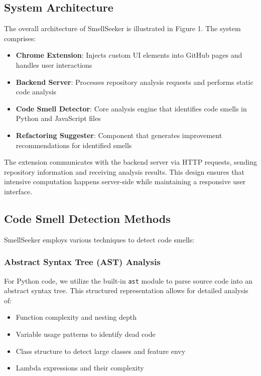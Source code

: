 \documentclass[sigconf,screen]{acmart}
\begin{document}
\subsection{System Architecture}

The overall architecture of SmellSeeker is illustrated in Figure 1. The system comprises:

\begin{itemize}
    \item \textbf{Chrome Extension}: Injects custom UI elements into GitHub pages and handles user interactions
    \item \textbf{Backend Server}: Processes repository analysis requests and performs static code analysis
    \item \textbf{Code Smell Detector}: Core analysis engine that identifies code smells in Python and JavaScript files
    \item \textbf{Refactoring Suggester}: Component that generates improvement recommendations for identified smells
\end{itemize}

The extension communicates with the backend server via HTTP requests, sending repository information and receiving analysis results. This design ensures that intensive computation happens server-side while maintaining a responsive user interface.

\subsection{Code Smell Detection Methods}

SmellSeeker employs various techniques to detect code smells:

\subsubsection{Abstract Syntax Tree (AST) Analysis}

For Python code, we utilize the built-in \texttt{ast} module to parse source code into an abstract syntax tree. This structured representation allows for detailed analysis of:

\begin{itemize}
    \item Function complexity and nesting depth
    \item Variable usage patterns to identify dead code
    \item Class structure to detect large classes and feature envy
    \item Lambda expressions and their complexity
\end{itemize}
\end{document}
